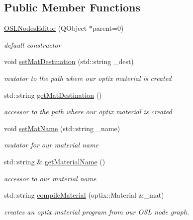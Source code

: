 \subsection*{Public Member Functions}
\begin{DoxyCompactItemize}
\item 
\hypertarget{class_o_s_l_nodes_editor_a50fca1e570de24c6147d264b72533ce5}{\hyperlink{class_o_s_l_nodes_editor_a50fca1e570de24c6147d264b72533ce5}{O\-S\-L\-Nodes\-Editor} (Q\-Object $\ast$parent=0)}\label{class_o_s_l_nodes_editor_a50fca1e570de24c6147d264b72533ce5}

\begin{DoxyCompactList}\small\item\em default constructor \end{DoxyCompactList}\item 
\hypertarget{class_o_s_l_nodes_editor_a3d53185e726ee8e247636af05f3cbf80}{void \hyperlink{class_o_s_l_nodes_editor_a3d53185e726ee8e247636af05f3cbf80}{set\-Mat\-Destination} (std\-::string \-\_\-dest)}\label{class_o_s_l_nodes_editor_a3d53185e726ee8e247636af05f3cbf80}

\begin{DoxyCompactList}\small\item\em mutator to the path where our optix material is created \end{DoxyCompactList}\item 
\hypertarget{class_o_s_l_nodes_editor_af5964ed254722881c65a834c60513ba6}{std\-::string \hyperlink{class_o_s_l_nodes_editor_af5964ed254722881c65a834c60513ba6}{get\-Mat\-Destination} ()}\label{class_o_s_l_nodes_editor_af5964ed254722881c65a834c60513ba6}

\begin{DoxyCompactList}\small\item\em accessor to the path where our optix material is created \end{DoxyCompactList}\item 
\hypertarget{class_o_s_l_nodes_editor_ad72361168d0605b5449b05d271535d23}{void \hyperlink{class_o_s_l_nodes_editor_ad72361168d0605b5449b05d271535d23}{set\-Mat\-Name} (std\-::string \-\_\-name)}\label{class_o_s_l_nodes_editor_ad72361168d0605b5449b05d271535d23}

\begin{DoxyCompactList}\small\item\em mutator for our material name \end{DoxyCompactList}\item 
std\-::string \& \hyperlink{class_o_s_l_nodes_editor_a6947b479148cf42fe6252621ff7a5251}{get\-Material\-Name} ()
\begin{DoxyCompactList}\small\item\em accessor to our material name \end{DoxyCompactList}\item 
std\-::string \hyperlink{class_o_s_l_nodes_editor_a4b1199c7b3d4449e08fb8d9e6080219b}{compile\-Material} (optix\-::\-Material \&\-\_\-mat)
\begin{DoxyCompactList}\small\item\em creates an optix material program from our O\-S\-L node graph. \end{DoxyCompactList}\end{DoxyCompactItemize}
